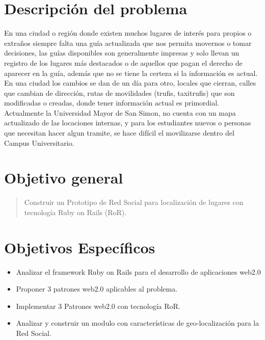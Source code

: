   \section{Descripción del problema} %
  \label{sec:desc_probl}
    En una ciudad o región donde existen muchos lugares de interés para propios o 
    extraños siempre falta una guía actualizada que nos permita movernos o tomar 
    decisiones, las guías disponibles son generalmente impresas y solo llevan un 
    registro de los lugares más destacados o de aquellos que pagan el derecho de 
    aparecer en la guía, además que no se tiene la certeza si la información  es 
    actual. \\

    En una ciudad los cambios se dan de un día para otro, locales que cierran, 
    calles que cambian de dirección,  rutas de movilidades (trufis, taxitrufis) 
    que son modificadas o creadas, donde tener información actual es primordial.\\

    Actualmente la Universidad Mayor de San Simon, no cuenta con un mapa
    actualizado de las locaciones  internas, y para los estudiantes nuevos o 
    personas que necesitan hacer algun tramite, se hace difícil el movilizarse
    dentro del Campus Universitario. 

  \section{Objetivo general} %
  \label{sec:objetivo_general}
    \begin{quote}
      Construir un Prototipo de Red Social para localización de lugares con 
      tecnología Ruby on Rails (RoR).
    \end{quote}

  \section{Objetivos Específicos} %
  \label{sec:obj_especificos}
    \begin{itemize}
      \item Analizar el framework Ruby on Rails para el desarrollo de aplicaciones web2.0
      \item Proponer 3 patrones web2.0 aplicables al problema.
      \item Implementar 3 Patrones web2.0 con tecnología RoR.
      \item Analizar y construir un modulo con características de geo-localización para la Red Social.
    \end{itemize}

